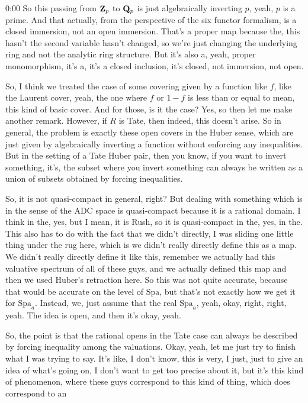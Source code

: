 \begin{unfinished}{0:00}
So this passing from $\mathbf Z_p$ to $\mathbf Q_p$ is just algebraically inverting $p$, yeah, $p$ is a prime. And that actually, from the perspective of the six functor formalism, is a closed immersion, not an open immersion. That's a proper map because the, this hasn't the second variable hasn't changed, so we're just changing the underlying ring and not the analytic ring structure. But it's also a, yeah, proper monomorphism, it's a, it's a closed inclusion, it's closed, not immersion, not open.

So, I think we treated the case of some covering given by a function like $f$, like the Laurent cover, yeah, the one where $f$ or $1-f$ is less than or equal to mean, this kind of basic cover. And for those, is it the case? Yes, so then let me make another remark. However, if $R$ is Tate, then indeed, this doesn't arise. So in general, the problem is exactly these open covers in the Huber sense, which are just given by algebraically inverting a function without enforcing any inequalities. But in the setting of a Tate Huber pair, then you know, if you want to invert something, it's, the subset where you invert something can always be written as a union of subsets obtained by forcing inequalities.

So, it is not quasi-compact in general, right? But dealing with something which is in the sense of the ADC space is quasi-compact because it is a rational domain. I think in the, yes, but I mean, it is Rush, so it is quasi-compact in the, yes, in the. This also has to do with the fact that we didn't directly, I was sliding one little thing under the rug here, which is we didn't really directly define this as a map. We didn't really directly define it like this, remember we actually had this valuative spectrum of all of these guys, and we actually defined this map and then we used Huber's retraction here. So this was not quite accurate, because that would be accurate on the level of $\mathrm{Spa}$, but that's not exactly how we get it for $\mathrm{Spa}_a$. Instead, we, just assume that the real $\mathrm{Spa}_a$, yeah, okay, right, right, yeah. The idea is open, and then it's okay, yeah.

So, the point is that the rational opens in the Tate case can always be described by forcing inequality among the valuations. Okay, yeah, let me just try to finish what I was trying to say. It's like, I don't know, this is very, I just, just to give an idea of what's going on, I don't want to get too precise about it, but it's this kind of phenomenon, where these guys correspond to this kind of thing, which does correspond to an


\end{unfinished}
